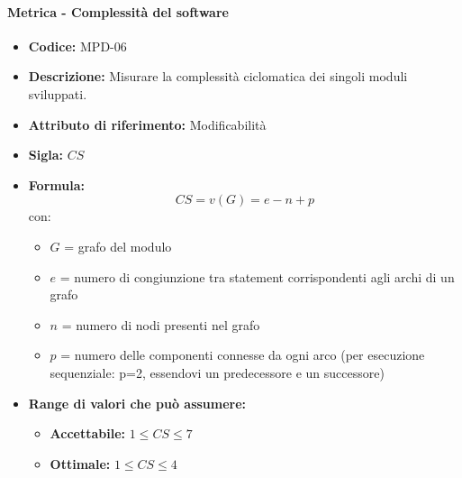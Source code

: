            \paragraph{Metrica - Complessità del software} 
              \begin{itemize}
         \item   \textbf{Codice:} MPD-06
         \item   \textbf{Descrizione:} Misurare la complessità ciclomatica dei singoli moduli sviluppati.
          \item  \textbf{Attributo di riferimento:} Modificabilità
          \item  \textbf{Sigla:} $CS$
         \item   \textbf{Formula:} $$CS = v(G) = e - n + p $$
         con:
         \begin{itemize}
            \item $G$ = grafo del modulo
            \item $e$ = numero di congiunzione tra statement corrispondenti agli archi di un grafo
            \item $n$ = numero di nodi presenti nel grafo
            \item $p$ = numero delle componenti connesse da ogni arco (per esecuzione sequenziale: p=2, essendovi un predecessore e un successore)
         \end{itemize}
           
        \item \textbf{Range di valori che può assumere:}
        \begin{itemize}
            \item \textbf{Accettabile:} $1 \leq CS \leq 7 $
            \item \textbf{Ottimale:} $ 1 \leq CS \leq 4 $
        \end{itemize}
       \end{itemize}
              

